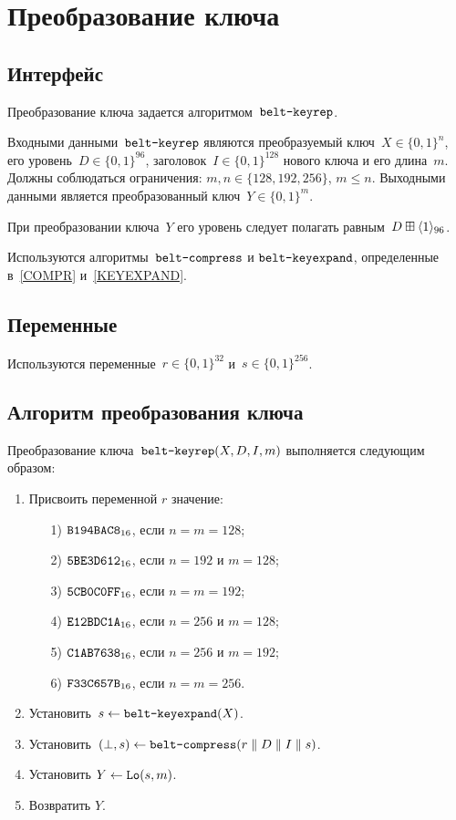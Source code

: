 \section{Преобразование ключа}\label{KEYREP}

\subsection{Интерфейс}\label{KEYREP.IFace}

Преобразование ключа задается алгоритмом~$\texttt{belt-keyrep}$.

Входными данными~$\texttt{belt-keyrep}$ являются 
преобразуемый ключ~$X\in\{0,1\}^n$,
его уровень~$D\in\{0,1\}^{96}$,
заголовок~$I\in\{0,1\}^{128}$ нового ключа и его длина~$m$.
%
Должны соблюдаться ограничения: $m,n\in\{128,192,256\}$, $m\leq n$.
%
Выходными данными является преобразованный ключ~$Y\in\{0,1\}^m$.

При преобразовании ключа~$Y$ его уровень следует полагать 
равным~$D\boxplus\langle1\rangle_{96}$.

Используются алгоритмы~$\texttt{belt-compress}$ и $\texttt{belt-keyexpand}$,
определенные в~\ref{COMPR} и~\ref{KEYEXPAND}.

\subsection{Переменные}\label{KEYREP.Vars}

Используются переменные~$r\in\{0,1\}^{32}$ и~$s\in\{0,1\}^{256}$.

\subsection{Алгоритм преобразования ключа}\label{KEYREP.Alg}

Преобразование ключа~$\texttt{belt-keyrep}(X,D,I,m)$
выполняется следующим образом:
\begin{enumerate}
\item
Присвоить переменной $r$ значение:
\begin{enumerate}
\item[1)]
$\texttt{B194BAC8}_{16}$, если $n=m=128$;
\item[2)]
$\texttt{5BE3D612}_{16}$, если $n=192$ и $m=128$;
\item[3)]
$\texttt{5CB0C0FF}_{16}$, если $n=m=192$;
\item[4)]
$\texttt{E12BDC1A}_{16}$, если $n=256$ и $m=128$;
\item[5)]
$\texttt{C1AB7638}_{16}$, если $n=256$ и $m=192$;
\item[6)]
$\texttt{F33C657B}_{16}$, если $n=m=256$.
\end{enumerate}

\item
Установить~$s\leftarrow\texttt{belt-keyexpand}(X)$.

\item
Установить~$(\perp,s)\leftarrow\texttt{belt-compress}
(r\parallel D\parallel I\parallel s)$. 

\item
Установить $Y\leftarrow\mathop{\texttt{Lo}}\nolimits(s, m)$.

\item
Возвратить $Y$.
\end{enumerate}
